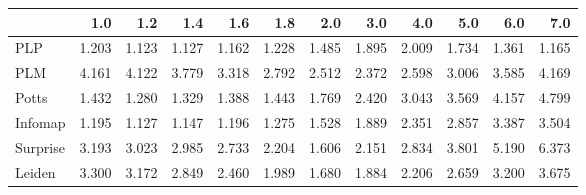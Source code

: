 \begin{tabular}{lrrrrrrrrrrr}
\toprule
{} &   1.0 &   1.2 &   1.4 &   1.6 &   1.8 &   2.0 &   3.0 &   4.0 &   5.0 &   6.0 &   7.0 \\
\midrule
PLP      & 1.203 & 1.123 & 1.127 & 1.162 & 1.228 & 1.485 & 1.895 & 2.009 & 1.734 & 1.361 & 1.165 \\
PLM      & 4.161 & 4.122 & 3.779 & 3.318 & 2.792 & 2.512 & 2.372 & 2.598 & 3.006 & 3.585 & 4.169 \\
Potts    & 1.432 & 1.280 & 1.329 & 1.388 & 1.443 & 1.769 & 2.420 & 3.043 & 3.569 & 4.157 & 4.799 \\
Infomap  & 1.195 & 1.127 & 1.147 & 1.196 & 1.275 & 1.528 & 1.889 & 2.351 & 2.857 & 3.387 & 3.504 \\
Surprise & 3.193 & 3.023 & 2.985 & 2.733 & 2.204 & 1.606 & 2.151 & 2.834 & 3.801 & 5.190 & 6.373 \\
Leiden   & 3.300 & 3.172 & 2.849 & 2.460 & 1.989 & 1.680 & 1.884 & 2.206 & 2.659 & 3.200 & 3.675 \\
\bottomrule
\end{tabular}
